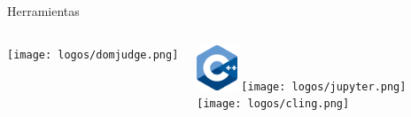 \begin{frame}[t]{Herramientas}
\begin{columns}[T]


\texttt{[image: logos/domjudge.png]}

\centering
\includegraphics[width=1.2cm]{logos/cpp.png}
\hspace{2em}
\texttt{[image: logos/jupyter.png]}\\
\vspace{3em}
\texttt{[image: logos/cling.png]}

\end{columns}
\end{frame}

